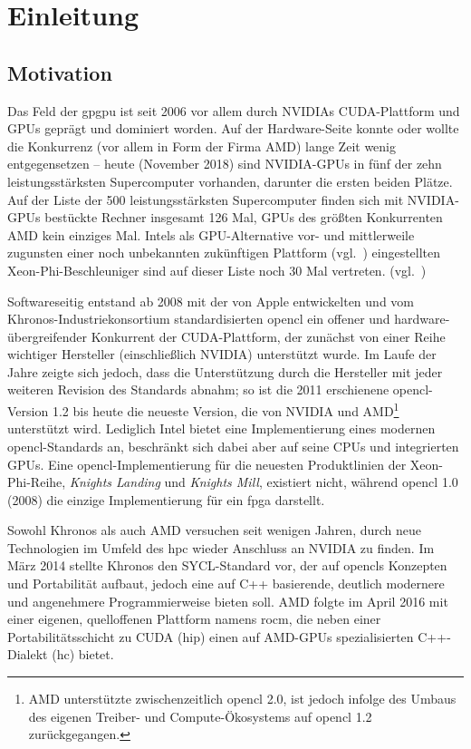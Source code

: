 \section{Einleitung}
\label{einleitung}

\subsection{Motivation}
\label{einleitung:motivation}

Das Feld der \gls{gpgpu} ist seit 2006 vor allem durch NVIDIAs CUDA-Plattform
und GPUs geprägt und dominiert worden. Auf der Hardware-Seite konnte oder
wollte die Konkurrenz (vor allem in Form der Firma AMD) lange Zeit wenig
entgegensetzen -- heute (November 2018) sind NVIDIA-GPUs in fünf der zehn
leistungsstärksten Supercomputer vorhanden, darunter die ersten beiden Plätze.
Auf der Liste der 500 leistungsstärksten Supercomputer finden sich mit
NVIDIA-GPUs bestückte Rechner insgesamt 126 Mal, GPUs des größten
Konkurrenten AMD kein einziges Mal. Intels als GPU-Alternative vor- und
mittlerweile zugunsten einer noch unbekannten zukünftigen Plattform
(vgl.~\cite{intel2017}) eingestellten Xeon-Phi-Beschleuniger sind auf dieser
Liste noch 30 Mal vertreten. (vgl.~\cite{top500})

Softwareseitig entstand ab 2008 mit der von Apple entwickelten und vom
Khronos-Industriekonsortium standardisierten \gls{opencl} ein offener und
hardware-übergreifender Konkurrent der CUDA-Plattform, der zunächst von einer
Reihe wichtiger Hersteller (einschließlich NVIDIA) unterstützt wurde. Im Laufe
der Jahre zeigte sich jedoch, dass die Unterstützung durch die Hersteller mit
jeder weiteren Revision des Standards abnahm; so ist die 2011 erschienene
\gls{opencl}-Version 1.2 bis heute die neueste Version, die von NVIDIA und
AMD\footnote{AMD unterstützte zwischenzeitlich \gls{opencl} 2.0, ist jedoch
infolge des Umbaus des eigenen Treiber- und Compute-Ökosystems auf \gls{opencl}
1.2 zurückgegangen.} unterstützt wird. Lediglich Intel bietet eine
Implementierung eines modernen \gls{opencl}-Standards an, beschränkt sich dabei
aber auf seine CPUs und integrierten GPUs. Eine \gls{opencl}-Implementierung für
die neuesten Produktlinien der Xeon-Phi-Reihe, \textit{Knights Landing} und
\textit{Knights Mill}, existiert nicht, während \gls{opencl} 1.0 (2008) die
einzige Implementierung für ein \gls{fpga} darstellt.

Sowohl Khronos als auch AMD versuchen seit wenigen Jahren, durch neue
Technologien im Umfeld des \gls{hpc} wieder Anschluss an NVIDIA zu finden. Im
März 2014 stellte Khronos den SYCL-Standard vor, der auf \gls{opencl}s Konzepten
und Portabilität aufbaut, jedoch eine auf C++ basierende, deutlich modernere
und angenehmere Programmierweise bieten soll. AMD folgte im April 2016 mit einer
eigenen, quelloffenen Plattform namens \gls{rocm}, die neben einer
Portabilitätsschicht zu CUDA (\gls{hip}) einen auf AMD-GPUs spezialisierten
C++-Dialekt (\gls{hc}) bietet.

